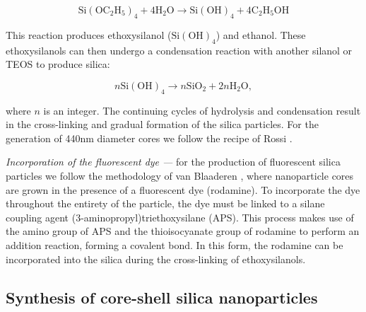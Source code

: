 \begin{equation}
	\mathrm{Si}(\mathrm{OC}_2\mathrm{H}_5)_{4}+4 \mathrm{H}_{2} \mathrm{O} \rightarrow \mathrm{Si}(\mathrm{OH})_{4}+4\mathrm{C}_2 \mathrm{H}_5\mathrm{OH}
\end{equation}


\noindent This reaction produces ethoxysilanol ($\mathrm{Si}(\mathrm{OH})_{4}$) and ethanol. These ethoxysilanols can then undergo a condensation reaction with another silanol or TEOS to produce silica:


\begin{equation}
	n\mathrm{Si}(\mathrm{OH})_{4} \rightarrow n\mathrm{SiO}_{2}+2n\mathrm{H}_{2} \mathrm{O},
\end{equation}

\noindent where $n$ is an integer. The continuing cycles of hydrolysis and condensation result in the cross-linking and gradual formation of the silica particles. For the generation of 440nm diameter cores we follow the recipe of Rossi \etal \cite{rossi2005}.



\textit{Incorporation of the fluorescent dye ---} for the production of fluorescent silica particles we follow the methodology of van Blaaderen \etal \cite{vanblaaderen1992}, where nanoparticle cores are grown in the presence of a fluorescent dye (rodamine). To incorporate the dye throughout the entirety of the particle, the dye must be linked to a silane coupling agent (3-aminopropyl)triethoxysilane (APS). This process makes use of the amino group of APS and the thioisocyanate group of rodamine to perform an addition reaction, forming a covalent bond. In this form, the rodamine can be incorporated into the silica during the cross-linking of ethoxysilanols.

\subsection{Synthesis of core-shell silica nanoparticles}
\label{sec:core_shell}

